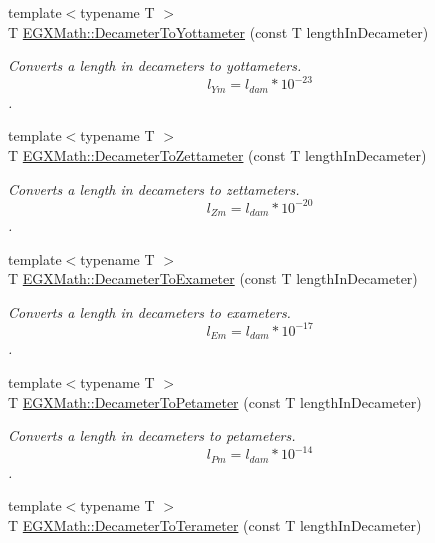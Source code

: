 \begin{DoxyCompactItemize}
{\footnotesize template$<$typename T $>$ }\\T \mbox{\hyperlink{group___e_g_x_math-_conversions-_length_conversions-_s_i-_decameter-_s_i_gaa10c7c9c4e75fc2d647d4f85ff8d801b}{E\+G\+X\+Math\+::\+Decameter\+To\+Yottameter}} (const T length\+In\+Decameter)
\begin{DoxyCompactList}\small\item\em Converts a length in decameters to yottameters. \[ l_{Ym}=l_{dam} * 10^{-23} \]. \end{DoxyCompactList}\item 
{\footnotesize template$<$typename T $>$ }\\T \mbox{\hyperlink{group___e_g_x_math-_conversions-_length_conversions-_s_i-_decameter-_s_i_ga63a6a9ec3ac42c9837818b82b1fdbcbb}{E\+G\+X\+Math\+::\+Decameter\+To\+Zettameter}} (const T length\+In\+Decameter)
\begin{DoxyCompactList}\small\item\em Converts a length in decameters to zettameters. \[ l_{Zm}=l_{dam} * 10^{-20} \]. \end{DoxyCompactList}\item 
{\footnotesize template$<$typename T $>$ }\\T \mbox{\hyperlink{group___e_g_x_math-_conversions-_length_conversions-_s_i-_decameter-_s_i_ga66b4bffe5923acdb3c8a249d81be196f}{E\+G\+X\+Math\+::\+Decameter\+To\+Exameter}} (const T length\+In\+Decameter)
\begin{DoxyCompactList}\small\item\em Converts a length in decameters to exameters. \[ l_{Em}=l_{dam} * 10^{-17} \]. \end{DoxyCompactList}\item 
{\footnotesize template$<$typename T $>$ }\\T \mbox{\hyperlink{group___e_g_x_math-_conversions-_length_conversions-_s_i-_decameter-_s_i_ga0475fbe33c57dc772e3121f776d82fd0}{E\+G\+X\+Math\+::\+Decameter\+To\+Petameter}} (const T length\+In\+Decameter)
\begin{DoxyCompactList}\small\item\em Converts a length in decameters to petameters. \[ l_{Pm}=l_{dam} * 10^{-14} \]. \end{DoxyCompactList}\item 
{\footnotesize template$<$typename T $>$ }\\T \mbox{\hyperlink{group___e_g_x_math-_conversions-_length_conversions-_s_i-_decameter-_s_i_ga94859159b401c261bf562ab4e3071508}{E\+G\+X\+Math\+::\+Decameter\+To\+Terameter}} (const T length\+In\+Decameter)

\end{DoxyCompactItemize}
